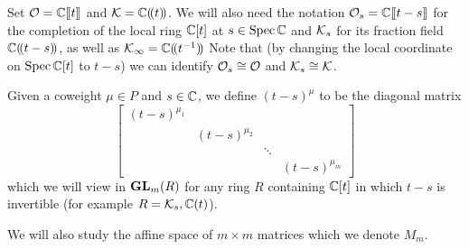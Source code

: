 \documentclass[draft]{article}
\begin{document}
Set $\cO = \CC\xt$ and $\cK = \CC\xT$. We will also need the notation $\cO_s = \CC\xt[t-s]$ for the completion of the local ring $\CC[t]$ at $s\in\spec\CC$ and $\cK_s$ for its fraction field $\CC\xT[t-s]$, as well as $\Kinf = \CC\xT[t^{-1}]$  
% 
Note that (by changing the local coordinate on $\spec\CC[t]$ to $t-s$) we can identify $\cO_s \cong \cO$ and $\cK_s\cong\cK$. 

Given a coweight $\mu \in P$ and $ s\in \CC$, we define $ (t-s)^\mu$ to be the diagonal matrix 
\[
\begin{bmatrix}
    (t-s)^{\mu_1} \\
    & (t-s)^{\mu_2} \\ 
    & & \ddots \\
    & & & (t-s)^{\mu_m}
\end{bmatrix} 
\]
which we will view in $\GL_m(R) $ for any ring $ R $ containing $\CC[t]$ in which $t-s$ is invertible (for example $ R = \Ks, \CC(t)$).

We will also study the affine space of $m\times m$ matrices which we denote $ M_m$.
% 
\end{document}
